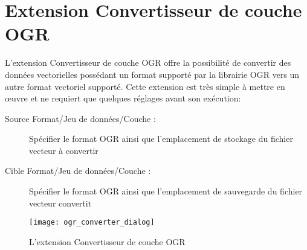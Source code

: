 
\section{Extension Convertisseur de couche OGR}


L'extension Convertisseur de couche OGR offre la possibilité de convertir des 
données vectorielles possédant un format supporté par la librairie OGR vers 
un autre format vectoriel supporté.
Cette extension est très simple à mettre en \oe uvre et ne requiert que 
quelques réglages avant son exécution:

\begin{description}
\item[Source Format/Jeu de données/Couche :] Spécifier le format OGR 
ainsi que l'emplacement de stockage du fichier vecteur à convertir
\item[Cible Format/Jeu de données/Couche :] Spécifier le format OGR 
ainsi que l'emplacement de sauvegarde du fichier vecteur convertit
\end{description}

\begin{figure}[ht]
   \centering
   \texttt{[image: ogr\_converter\_dialog]}
   \caption{L'extension Convertisseur de couche OGR \nixcaption}\label{fig:ogr_converter_dialog}
\end{figure}

